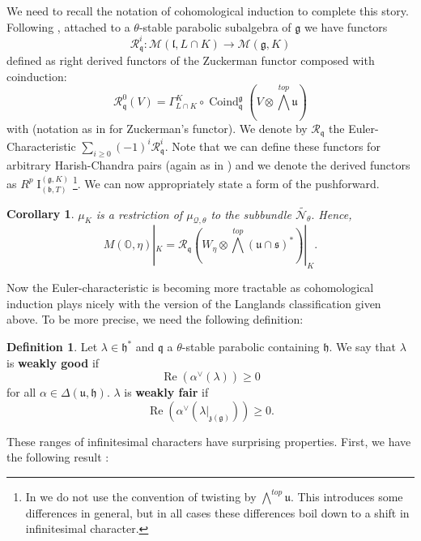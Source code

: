 \documentclass[letterpaper,twosided,11pt]{article}
\theoremstyle{plain}
\newtheorem{corollary}[theorem]{Corollary}
\theoremstyle{definition}
\newtheorem{definition}{Definition}
\theoremstyle{remark}
\newcommand{\OO}{\mathbb{O}}
\newcommand{\KSpRes}{\widetilde{\mathcal{N}_\theta}}
\newcommand{\tensor}{\otimes}
\newcommand{\comp}{\circ}
\newcommand{\Coind}{\operatorname{Coind}}
\newcommand{\lie}[1]{\mathfrak{#1}}
\begin{document}
We need to recall the notation of cohomological induction to complete this story. Following \cite{Vogan1984}, attached to a $\theta$-stable parabolic subalgebra of $\lie{g}$ we have functors \[ \mathcal{R}_\lie{q}^i:\mathcal{M}(\lie{l},L\cap K)\to \mathcal{M}(\lie{g},K) \]
 defined as right derived functors of the Zuckerman functor composed with coinduction: \[\mathcal{R}_\lie{q}^0(V)=\Gamma_{L\cap K}^K\comp \Coind_{\lie{q}}^\lie{g}(V\tensor \textstyle{\bigwedge^{top}} \lie{u})\] with (notation as in \cite{CookCohomNotes} for Zuckerman's functor). We denote by $\mathcal{R}_\lie{q}$ the Euler-Characteristic $\sum_{i\geq 0} (-1)^i \mathcal{R}_\lie{q}^i.$ Note that we can define these functors for arbitrary Harish-Chandra pairs (again as in \cite{CookCohomNotes}) and we denote the derived functors as $R^p\operatorname{I}_{(\lie{b},T)}^{(\lie{g},K)}$\footnote{In \cite{CookCohomNotes} we do not use the convention of twisting by $\bigwedge^{top}\lie{u}.$ This introduces some differences in general, but in all cases these differences boil down to a shift in infinitesimal character.}.  We can now appropriately state a form of the pushforward.
 


\begin{corollary} 
	$\mu_K$ is a restriction of $\mu_{\mathcal{Q},\theta}$ to the subbundle $\KSpRes.$ Hence, \[M(\OO,\eta)|_K=\mathcal{R}_\lie{q}(W_\eta\tensor \textstyle{\bigwedge}^{top}(\lie{u}\cap \lie{s})^*)|_K.  \]
\end{corollary} 

  
  
 Now the Euler-characteristic is becoming more tractable as cohomological induction plays nicely with the version of the Langlands classification given above. To be more precise, we need the following definition: 
  
 \begin{definition}\label{Good_Fair_Range}
 	Let $\lambda\in \lie{h}^*$ and $\lie{q}$ a $\theta$-stable parabolic containing $\lie{h}.$ We say that $\lambda$ is \textbf{weakly good} if \[ \operatorname{Re}(\alpha^\vee(\lambda))\geq 0\] 
	for all $\alpha\in \Delta(\lie{u},\lie{h}).$ $\lambda$ is \textbf{weakly fair} if \[  \operatorname{Re}(\alpha^\vee(\lambda|_{\lie{z}(\lie{g})}))\geq 0.\]
 \end{definition} 
 
 
 These ranges of infinitesimal characters have surprising properties. First, we have the following result \cite[Proposition 4.18]{Vogan1984}:
 
\end{document}
